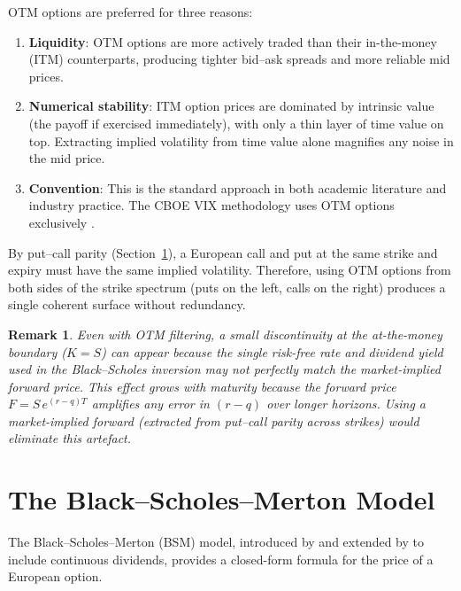 \documentclass[12pt, a4paper]{article}
\newtheorem{remark}{Remark}
\begin{document}
OTM options are preferred for three reasons:
\begin{enumerate}[nosep]
    \item \textbf{Liquidity}: OTM options are more actively traded than their
          in-the-money (ITM) counterparts, producing tighter bid--ask spreads
          and more reliable mid prices.
    \item \textbf{Numerical stability}: ITM option prices are dominated by
          intrinsic value (the payoff if exercised immediately), with only a
          thin layer of time value on top. Extracting implied volatility from
          time value alone magnifies any noise in the mid price.
    \item \textbf{Convention}: This is the standard approach in both academic
          literature and industry practice. The CBOE VIX methodology
          uses OTM options exclusively \parencite{cboe2019vix}.
\end{enumerate}

By put--call parity (Section~\ref{sec:bsm}), a European call and put at the
same strike and expiry must have the same implied volatility. Therefore, using
OTM options from both sides of the strike spectrum (puts on the left, calls on
the right) produces a single coherent surface without redundancy.

\begin{remark}
Even with OTM filtering, a small discontinuity at the at-the-money boundary
($K = S$) can appear because the single risk-free rate and dividend yield used
in the Black--Scholes inversion may not perfectly match the market-implied
forward price. This effect grows with maturity because the forward price
$F = S\,e^{(r-q)T}$ amplifies any error in $(r - q)$ over longer horizons.
Using a market-implied forward (extracted from put--call parity across strikes)
would eliminate this artefact.
\end{remark}

\section{The Black--Scholes--Merton Model}
\label{sec:bsm}

The Black--Scholes--Merton (BSM) model, introduced by
\textcite{black1973pricing} and extended by \textcite{merton1973theory} to
include continuous dividends, provides a closed-form formula for the price of a
European option.
\end{document}
